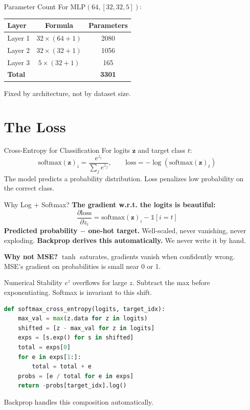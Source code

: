 \documentclass[10pt]{beamer}
\begin{document}
\begin{frame}{Parameter Count}
    For $\text{MLP}(64, [32, 32, 5])$:
    \begin{table}
        \centering
        \begin{tabular}{@{}lcc@{}}
            \toprule
            Layer & Formula & Parameters \\
            \midrule
            Layer 1 & $32 \times (64+1)$ & 2080 \\
            Layer 2 & $32 \times (32+1)$ & 1056 \\
            Layer 3 & $5 \times (32+1)$ & 165 \\
            \midrule
            \textbf{Total} & & \textbf{3301} \\
            \bottomrule
        \end{tabular}
    \end{table}
    Fixed by architecture, not by dataset size.
\end{frame}

\section{The Loss}

\begin{frame}{Cross-Entropy for Classification}
    For logits $\mathbf{z}$ and target class $t$:
    \[
        \text{softmax}(\mathbf{z})_i = \frac{e^{z_i}}{\sum_j e^{z_j}}, \qquad
        \text{loss} = -\log(\text{softmax}(\mathbf{z})_t)
    \]
    The model predicts a probability distribution. Loss penalizes low probability on the correct class.
\end{frame}

\begin{frame}{Why Log + Softmax?}
    \textbf{The gradient w.r.t. the logits is beautiful:}
    \[
        \frac{\partial\text{loss}}{\partial z_i} = \text{softmax}(\mathbf{z})_i - \mathbb{1}[i = t]
    \]
    \textbf{Predicted probability $-$ one-hot target.} Well-scaled, never vanishing, never exploding.
    \textbf{Backprop derives this automatically.} We never write it by hand.

    \textbf{Why not MSE?} $\tanh$ saturates, gradients vanish when confidently wrong. MSE's gradient on probabilities is small near 0 or 1.
\end{frame}

\begin{frame}{Numerical Stability}
    $e^z$ overflows for large $z$. Subtract the max before exponentiating. Softmax is invariant to this shift.
    \begin{lstlisting}[language=Python, caption={Stable softmax cross-entropy}]
def softmax_cross_entropy(logits, target_idx):
    max_val = max(z.data for z in logits)
    shifted = [z - max_val for z in logits]
    exps = [s.exp() for s in shifted]
    total = exps[0]
    for e in exps[1:]:
        total = total + e
    probs = [e / total for e in exps]
    return -probs[target_idx].log()
    \end{lstlisting}
    Backprop handles this composition automatically.
\end{frame}
\end{document}
